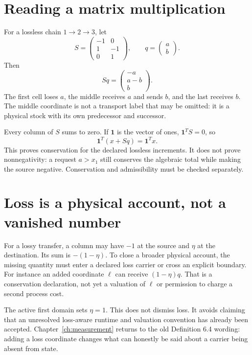 \section{Reading a matrix multiplication}
For a lossless chain $1\to2\to3$, let
\begin{equation}
 S=\begin{pmatrix}-1&0\\1&-1\\0&1\end{pmatrix},
 \qquad q=\begin{pmatrix}a\\b\end{pmatrix}.
\end{equation}
Then
\begin{equation}
 Sq=\begin{pmatrix}-a\\a-b\\b\end{pmatrix}.
\end{equation}
The first cell loses $a$, the middle receives $a$ and sends $b$, and the
last receives $b$. The middle coordinate is not a transport label that may
be omitted: it is a physical stock with its own predecessor and successor.

Every column of $S$ sums to zero. If $\mathbf1$ is the vector of ones,
$\mathbf1^T S=0$, so
\begin{equation}
 \mathbf1^T(x+Sq)=\mathbf1^Tx.
\end{equation}
This proves conservation for the declared lossless increments. It does not
prove nonnegativity: a request $a>x_1$ still conserves the algebraic total
while making the source negative. Conservation and admissibility must be
checked separately.

\section{Loss is a physical account, not a vanished number}
For a lossy transfer, a column may have $-1$ at the source and $\eta$ at the
destination. Its sum is $-(1-\eta)$. To close a broader physical account,
the missing quantity must enter a declared loss carrier or cross an explicit
boundary. For instance an added coordinate $\ell$ can receive
$(1-\eta)q$. That is a conservation declaration, not yet a valuation of
$\ell$ or permission to charge a second process cost.

The active first domain sets $\eta=1$. This does not dismiss loss. It avoids
claiming that an unresolved loss-aware runtime and valuation convention has
already been accepted. Chapter~\ref{ch:measurement} returns to the old Definition 6.4 wording:
adding a loss coordinate changes what can honestly be said about a carrier
being absent from state.

